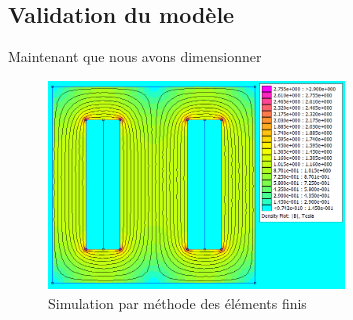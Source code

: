 
\subsection{Validation du modèle}
Maintenant que nous avons dimensionner


\begin{figure}
	\begin{center}
	\includegraphics[width=0.7\textwidth]{images/TP1_FEMM_validation}
	\caption{Simulation par méthode des éléments finis}\label{img:FEMMvalidation}
	\end{center}
\end{figure}
\FloatBarrier 
